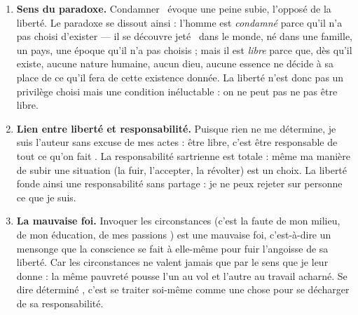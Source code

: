 \documentclass[11pt]{article}
\newcommand{\cle}[1]{{\popxbold\color{popdark}#1}}
\begin{document}
\begin{corrige}
\begin{enumerate}
\item \textbf{Sens du paradoxe.} \guillemotleft Condamner \guillemotright\ évoque une peine subie, l'opposé de la liberté. Le paradoxe se dissout ainsi : l'homme est \emph{condamné} parce qu'il n'a pas choisi d'exister — il se découvre \guillemotleft jeté \guillemotright\ dans le monde, né dans une famille, un pays, une époque qu'il n'a pas choisis ; mais il est \emph{libre} parce que, dès qu'il existe, aucune nature humaine, aucun dieu, aucune essence ne décide à sa place de ce qu'il fera de cette existence donnée. La liberté n'est donc pas un privilège choisi mais une condition inéluctable : on ne peut pas ne pas être libre.
\item \textbf{Lien entre liberté et responsabilité.} Puisque rien ne me détermine, je suis l'auteur sans excuse de mes actes : être libre, c'est être \guillemotleft responsable de tout ce qu'on fait \guillemotright. La responsabilité sartrienne est totale : même ma manière de subir une situation (la fuir, l'accepter, la révolter) est un choix. La liberté fonde ainsi une responsabilité sans partage : je ne peux rejeter sur personne ce que je suis.
\item \textbf{La \cle{mauvaise foi}.} Invoquer les circonstances (\guillemotleft c'est la faute de mon milieu, de mon éducation, de mes passions \guillemotright) est une mauvaise foi, c'est-à-dire un mensonge que la conscience se fait à elle-même pour fuir l'angoisse de sa liberté. Car les circonstances ne valent jamais que par le sens que je leur donne : la même pauvreté pousse l'un au vol et l'autre au travail acharné. Se dire \guillemotleft déterminé \guillemotright, c'est se traiter soi-même comme une chose pour se décharger de sa responsabilité.
\end{enumerate}
\end{corrige}
\end{document}
